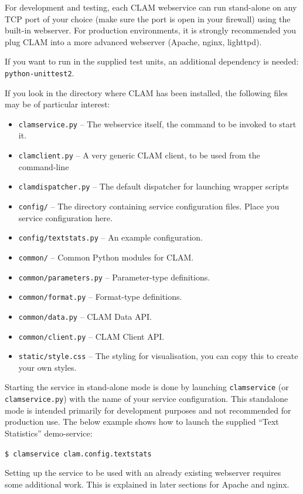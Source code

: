 \documentclass[a4paper,12pt]{report}
\begin{document}
For development and testing, each CLAM webservice can run stand-alone on any
TCP port of your choice (make sure the port is open in your firewall) using the
built-in webserver. For production environments, it is strongly recommended you
plug CLAM into a more advanced webserver (Apache, nginx, lighttpd). 

If you want to run in the supplied test units, an additional dependency is
needed: \texttt{python-unittest2}.

If you look in the directory where CLAM has been installed, the following files
may be of particular interest:

\begin{itemize}
\item \texttt{clamservice.py} -- The webservice itself, the command to be invoked to start it.
\item \texttt{clamclient.py} -- A very generic CLAM client, to be used from the command-line
\item \texttt{clamdispatcher.py} -- The default dispatcher for launching wrapper scripts
\item \texttt{config/} -- The directory containing service configuration files. Place you service configuration here.
\item \texttt{config/textstats.py} -- An example configuration.
\item \texttt{common/} -- Common Python modules for CLAM.
\item \texttt{common/parameters.py} -- Parameter-type definitions.
\item \texttt{common/format.py} -- Format-type definitions.
\item \texttt{common/data.py} -- CLAM Data API.
\item \texttt{common/client.py} -- CLAM Client API.
\item \texttt{static/style.css} -- The styling for visualisation, you can copy this to create your own styles.
\end{itemize}

Starting the service in stand-alone mode is done by launching
\texttt{clamservice} (or \texttt{clamservice.py}) with the name of your service
configuration. This standalone mode is intended primarily for development
purposes and not recommended for production use. The below example shows how to
launch the supplied ``Text Statistics'' demo-service:

\texttt{\$ clamservice clam.config.textstats}

Setting up the service to be used with an already existing webserver requires
some additional work. This is explained in later sections for Apache and nginx.
\end{document}
